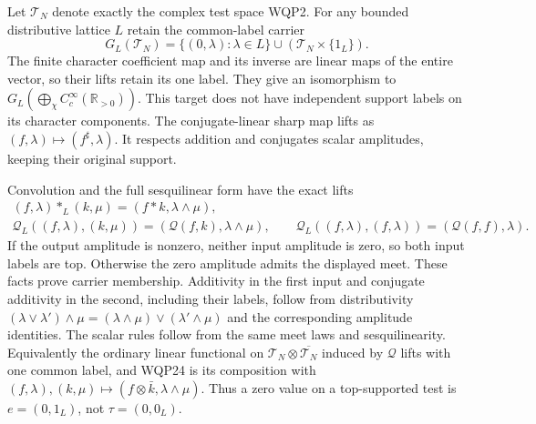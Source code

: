 Let $\mathcal T_N$ denote exactly the complex test space WQP2.
For any bounded distributive lattice $L$ retain the common-label
carrier
\begin{equation}\tag{WQP23}
 G_L(\mathcal T_N)=
   \{(0,\lambda):\lambda\in L\}\cup
                          (\mathcal T_N\times\{1_L\}).
\end{equation}
The finite character coefficient map and its inverse are linear
maps of the entire vector, so their lifts retain its one label.
They give an isomorphism to
$G_L(\bigoplus_\chi C_c^\infty(\mathbb R_{>0}))$.
This target does not have independent support labels on its
character components. The conjugate-linear sharp map lifts as
$(f,\lambda)\mapsto(f^\sharp,\lambda)$. It respects addition and
conjugates scalar amplitudes, keeping their original support.

Convolution and the full sesquilinear form have the exact lifts
\begin{equation}\tag{WQP24}
 \begin{gathered}
 (f,\lambda)*_L(k,\mu)=(f*k,\lambda\wedge\mu),\\
 \mathcal Q_L((f,\lambda),(k,\mu))
                   =(\mathcal Q(f,k),\lambda\wedge\mu),\qquad
 \mathcal Q_L((f,\lambda),(f,\lambda))
                   =(\mathcal Q(f,f),\lambda).
 \end{gathered}
\end{equation}
If the output amplitude is nonzero, neither input amplitude is
zero, so both input labels are top. Otherwise the zero amplitude
admits the displayed meet. These facts prove carrier membership.
Additivity in the first input and conjugate additivity in the
second, including their labels, follow from distributivity
$(\lambda\vee\lambda')\wedge\mu=
(\lambda\wedge\mu)\vee(\lambda'\wedge\mu)$ and the corresponding
amplitude identities. The scalar rules follow from the same meet
laws and sesquilinearity. Equivalently the ordinary linear
functional on $\mathcal T_N\otimes\overline{\mathcal T_N}$
induced by $\mathcal Q$ lifts with one common label, and WQP24
is its composition with
$(f,\lambda),(k,\mu)\mapsto(f\otimes\bar k,\lambda\wedge\mu)$.
Thus a zero value on a top-supported test is $e=(0,1_L)$,
not $\tau=(0,0_L)$.


